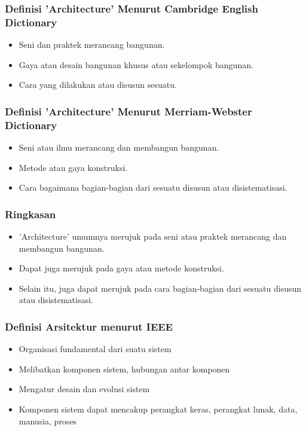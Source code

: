 \documentclass[aspectratio=169, table]{beamer}
\begin{document}
	\begin{frame}
		\frametitle{Definisi 'Architecture' Menurut Cambridge English Dictionary}
		\begin{itemize}
			\item Seni dan praktek merancang bangunan.
			\item Gaya atau desain bangunan khusus atau sekelompok bangunan.
			\item Cara yang dilakukan atau disusun sesuatu.
		\end{itemize}
	\end{frame}
	
	\begin{frame}
		\frametitle{Definisi 'Architecture' Menurut Merriam-Webster Dictionary}
		\begin{itemize}
			\item Seni atau ilmu merancang dan membangun bangunan.
			\item Metode atau gaya konstruksi.
			\item Cara bagaimana bagian-bagian dari sesuatu disusun atau disistematisasi.
		\end{itemize}
	\end{frame}
	
	\begin{frame}
		\frametitle{Ringkasan}
		\begin{itemize}
			\item 'Architecture' umumnya merujuk pada seni atau praktek merancang dan membangun bangunan.
			\item Dapat juga merujuk pada gaya atau metode konstruksi.
			\item Selain itu, juga dapat merujuk pada cara bagian-bagian dari sesuatu disusun atau disistematisasi.
		\end{itemize}
	\end{frame}
	
	\begin{frame}
		\frametitle{Definisi Arsitektur menurut IEEE}
		\begin{itemize}
			\item Organisasi fundamental dari suatu sistem
			\item Melibatkan komponen sistem, hubungan antar komponen
			\item Mengatur desain dan evolusi sistem
			\item Komponen sistem dapat mencakup perangkat keras, perangkat lunak, data, manusia, proses
		\end{itemize}
	\end{frame}
	
\end{document}
